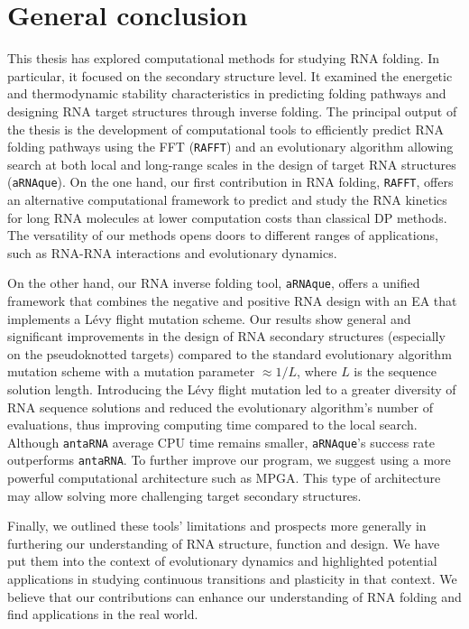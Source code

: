 \chapter{General conclusion}\label{ch:conclusion}

This thesis has explored computational methods for studying \ac{RNA} folding. In particular, it focused on the secondary structure level. It examined the energetic and thermodynamic stability characteristics in predicting folding pathways and designing \ac{RNA} target structures through inverse folding. The principal output of the thesis is the development of computational tools to efficiently predict \ac{RNA} folding pathways using the \ac{FFT} (\texttt{RAFFT}) and an evolutionary algorithm allowing search at both local and long-range scales in the design of target \ac{RNA} structures (\texttt{aRNAque}). On the one hand, our first contribution in \ac{RNA} folding, \texttt{RAFFT}, offers an alternative computational framework to predict and study the \ac{RNA} kinetics for long \ac{RNA} molecules at lower computation costs than classical \ac{DP} methods. The versatility of our methods opens doors to different ranges of applications, such as \ac{RNA}-\ac{RNA} interactions and evolutionary dynamics. 

On the other hand, our \ac{RNA} inverse folding tool, \texttt{aRNAque}, offers a unified framework that combines the negative and positive \ac{RNA} design with an \ac{EA} that implements a Lévy flight mutation scheme. Our results show general and significant improvements in the design of \ac{RNA} secondary structures (especially on the pseudoknotted targets) compared to the standard evolutionary algorithm mutation scheme with a mutation parameter $\approx 1/L$, where $L$ is the sequence solution length. Introducing the Lévy flight mutation led to a greater diversity of \ac{RNA} sequence solutions and reduced the evolutionary algorithm's number of evaluations, thus improving computing time compared to the local search. Although \texttt{antaRNA} average \ac{CPU} time remains smaller, \texttt{aRNAque}’s success rate outperforms \texttt{antaRNA}. To further improve our program, we suggest using a more powerful computational architecture such as \ac{MPGA}. This type of architecture may allow solving more challenging target secondary structures.

Finally, we outlined these tools' limitations and prospects more generally in furthering our understanding of \ac{RNA} structure, function and design. We have put them into the context of evolutionary dynamics and highlighted potential applications in studying continuous transitions and plasticity in that context. We believe that our contributions can enhance our understanding of \ac{RNA} folding and find applications in the real world.

